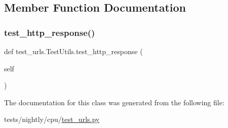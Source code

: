 \subsection{Member Function Documentation}
\mbox{\label{classtest__urls_1_1TestUtils_a5575b932cdbb76885c5c325f91b098ff}} 
\subsubsection{\texorpdfstring{test\+\_\+http\+\_\+response()}{test\_http\_response()}}
{\footnotesize\ttfamily def test\+\_\+urls.\+Test\+Utils.\+test\+\_\+http\+\_\+response (\begin{DoxyParamCaption}\item[{}]{self }\end{DoxyParamCaption})}



The documentation for this class was generated from the following file\+:\begin{DoxyCompactItemize}
\item 
tests/nightly/cpu/\hyperlink{test__urls_8py}{test\+\_\+urls.\+py}\end{DoxyCompactItemize}
